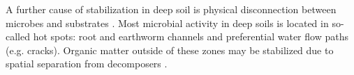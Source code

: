 \documentclass[11pt, oneside, a4paper]{article}   	%
\begin{document}
A further cause of stabilization in deep soil is physical disconnection between microbes and substrates \citep{Don2013, Gleixner2013}. Most microbial activity in deep soils is located in
so-called hot spots: root and earthworm channels and preferential water flow paths
(e.g. cracks). Organic matter outside of these zones may be stabilized due to spatial
separation from decomposers \citep{Chabbi2009}. 
\end{document}
